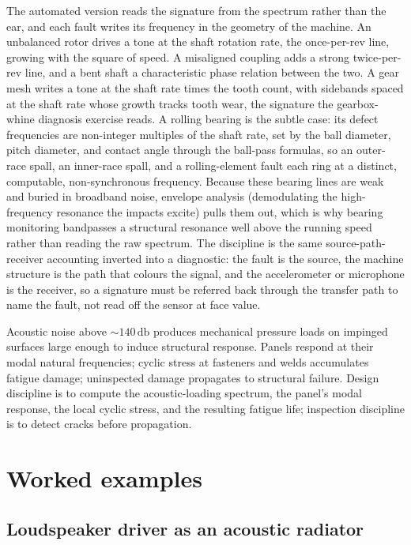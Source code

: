 The automated version reads the signature from the spectrum rather than the
ear, and each fault writes its frequency in the geometry of the machine. An
unbalanced rotor drives a tone at the shaft rotation rate, the once-per-rev
line, growing with the square of speed. A misaligned coupling adds a strong
twice-per-rev line, and a bent shaft a characteristic phase relation between
the two. A gear mesh writes a tone at the shaft rate times the tooth count,
with sidebands spaced at the shaft rate whose growth tracks tooth wear, the
signature the gearbox-whine diagnosis exercise reads. A rolling bearing is
the subtle case: its defect frequencies are non-integer multiples of the
shaft rate, set by the ball diameter, pitch diameter, and contact angle
through the ball-pass formulas, so an outer-race spall, an inner-race spall,
and a rolling-element fault each ring at a distinct, computable, non-synchronous
frequency. Because these bearing lines are weak and buried in broadband
noise, envelope analysis (demodulating the high-frequency resonance the
impacts excite) pulls them out, which is why bearing monitoring bandpasses a
structural resonance well above the running speed rather than reading the raw
spectrum. The discipline is the same source-path-receiver accounting inverted
into a diagnostic: the fault is the source, the machine structure is the
path that colours the signal, and the accelerometer or microphone is the
receiver, so a signature must be referred back through the transfer path to
name the fault, not read off the sensor at face value.

\begin{principle}
Acoustic noise above $\sim 140\,\si{\decibel}$ produces mechanical
pressure loads on impinged surfaces large enough to induce
structural response. Panels respond at their modal natural
frequencies; cyclic stress at fasteners and welds accumulates fatigue
damage; uninspected damage propagates to structural failure. Design
discipline is to compute the acoustic-loading spectrum, the panel's
modal response, the local cyclic stress, and the resulting fatigue
life; inspection discipline is to detect cracks before propagation.
\end{principle}

\section{Worked examples}

\subsection{Loudspeaker driver as an acoustic radiator}

